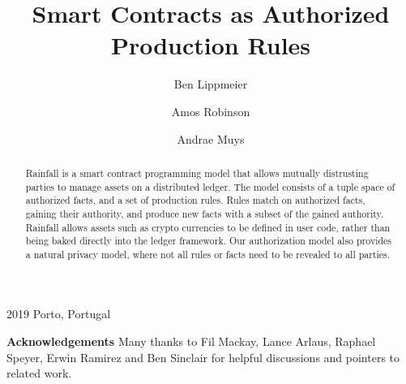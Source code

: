 \documentclass[format=sigconf, review=true, screen=true]{acmart}
\begin{document}
        {2019}
        {Porto, Portugal}

\title{Smart Contracts as Authorized Production Rules}

\author{Ben Lippmeier}

\author{Amos Robinson}

\author{Andrae Muys}

\begin{abstract}
Rainfall is a smart contract programming model that allows mutually distrusting parties to manage assets on a distributed ledger. The model consists of a tuple space of authorized facts, and a set of production rules. Rules match on authorized facts, gaining their authority, and produce new facts with a subset of the gained authority. Rainfall allows assets such as crypto currencies to be defined in user code, rather than being baked directly into the ledger framework. Our authorization model also provides a natural privacy model, where not all rules or facts need to be revealed to all parties.
\end{abstract}

\maketitle
\makeatactive








\textbf{Acknowledgements}
Many thanks to Fil Mackay, Lance Arlaus, Raphael Speyer, Erwin Ramirez and Ben Sinclair for helpful discussions and pointers to related work.


\clearpage{}



\clearpage{}

\end{document}
